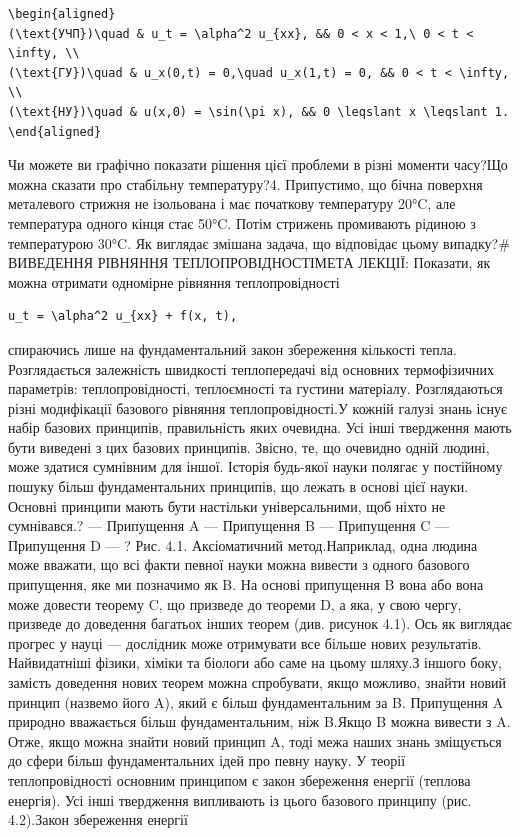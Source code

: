 \documentclass[
  ukrainian,
]{article}
\begin{document}
\begin{verbatim}
\begin{aligned}
(\text{УЧП})\quad & u_t = \alpha^2 u_{xx}, && 0 < x < 1,\ 0 < t < \infty, \\
(\text{ГУ})\quad & u_x(0,t) = 0,\quad u_x(1,t) = 0, && 0 < t < \infty, \\
(\text{НУ})\quad & u(x,0) = \sin(\pi x), && 0 \leqslant x \leqslant 1.
\end{aligned}
\end{verbatim}

Чи можете ви графічно показати рішення цієї проблеми в різні моменти
часу?Що можна сказати про стабільну температуру?4. Припустимо, що бічна
поверхня металевого стрижня не ізольована і має початкову температуру
20°C, але температура одного кінця стає 50°C. Потім стрижень промивають
рідиною з температурою 30°C. Як виглядає змішана задача, що відповідає
цьому випадку?\# ВИВЕДЕННЯ РІВНЯННЯ ТЕПЛОПРОВІДНОСТІМЕТА ЛЕКЦІЇ:
Показати, як можна отримати одномірне рівняння теплопровідності

\begin{verbatim}
u_t = \alpha^2 u_{xx} + f(x, t),
\end{verbatim}

спираючись лише на фундаментальний закон збереження кількості тепла.
Розглядається залежність швидкості теплопередачі від основних
термофізичних параметрів: теплопровідності, теплоємності та густини
матеріалу. Розглядаються різні модифікації базового рівняння
теплопровідності.У кожній галузі знань існує набір базових принципів,
правильність яких очевидна. Усі інші твердження мають бути виведені з
цих базових принципів. Звісно, те, що очевидно одній людині, може
здатися сумнівним для іншої. Історія будь-якої науки полягає у
постійному пошуку більш фундаментальних принципів, що лежать в основі
цієї науки. Основні принципи мають бути настільки універсальними, щоб
ніхто не сумнівався.? --- Припущення A --- Припущення B --- Припущення C
--- Припущення D --- ? Рис. 4.1. Аксіоматичний метод.Наприклад, одна
людина може вважати, що всі факти певної науки можна вивести з одного
базового припущення, яке ми позначимо як B. На основі припущення B вона
або вона може довести теорему C, що призведе до теореми D, а яка, у свою
чергу, призведе до доведення багатьох інших теорем (див. рисунок 4.1).
Ось як виглядає прогрес у науці --- дослідник може отримувати все більше
нових результатів. Найвидатніші фізики, хіміки та біологи або саме на
цьому шляху.З іншого боку, замість доведення нових теорем можна
спробувати, якщо можливо, знайти новий принцип (назвемо його A), який є
більш фундаментальним за B. Припущення A природно вважається більш
фундаментальним, ніж B.Якщо B можна вивести з A. Отже, якщо можна знайти
новий принцип A, тоді межа наших знань зміщується до сфери більш
фундаментальних ідей про певну науку. У теорії теплопровідності основним
принципом є закон збереження енергії (теплова енергія). Усі інші
твердження випливають із цього базового принципу (рис. 4.2).Закон
збереження енергії
\end{document}

